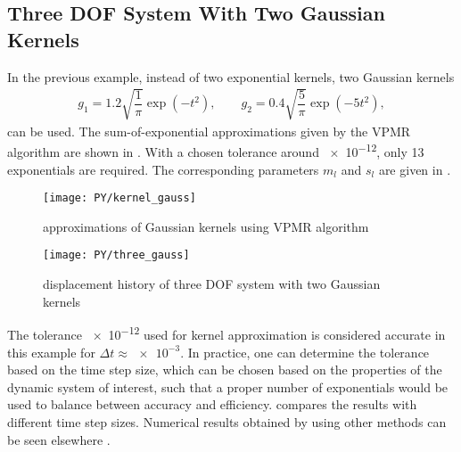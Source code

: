 \subsection{Three DOF System With Two Gaussian Kernels}
In the previous example, instead of two exponential kernels, two Gaussian kernels
\begin{gather}
g_1=1.2\sqrt{\dfrac{1}{\pi}}\exp\left(-t^2\right),\qquad
g_2=0.4\sqrt{\dfrac{5}{\pi}}\exp\left(-5t^2\right),
\end{gather}
can be used. The sum-of-exponential approximations given by the VPMR algorithm are shown in . With a chosen tolerance around \num{e-12}, only \num{13} exponentials are required. The corresponding parameters $m_l$ and $s_l$ are given in .
\begin{figure}[H]
\centering
\texttt{[image: PY/kernel\_gauss]}
\caption{approximations of Gaussian kernels using VPMR algorithm}\label{fig:vpmr}
\end{figure}

\begin{figure}[H]
\centering
\texttt{[image: PY/three\_gauss]}
\caption{displacement history of three DOF system with two Gaussian kernels}\label{fig:three_gauss}
\end{figure}
The tolerance \num{e-12} used for kernel approximation is considered accurate in this example for $\Delta{}t\approx\num{e-3}$. In practice, one can determine the tolerance based on the time step size, which can be chosen based on the properties of the dynamic system of interest, such that a proper number of exponentials would be used to balance between accuracy and efficiency.  compares the results with different time step sizes. Numerical results obtained by using other methods can be seen elsewhere \citep{Shen2021}.

